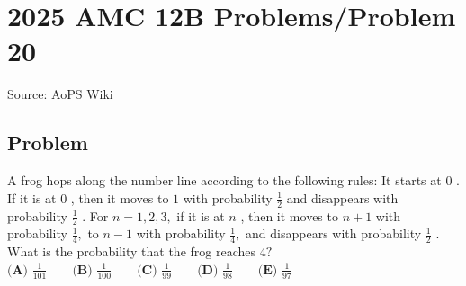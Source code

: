 \documentclass[12pt]{article}
\begin{document}
\section*{{2025 AMC 12B Problems/Problem 20}}
Source: AoPS Wiki

\subsection*{Problem}
A frog hops along the number line according to the following rules: It starts at $0$ . If it is at $0$ , then it moves to $1$ with probability $\frac 12$ and disappears with probability $\frac 12$ . For $n=1,2,3,$ if it is at $n$ , then it moves to $n+1$ with probability $\frac 14,$ to $n-1$ with probability $\frac 14,$ and disappears with probability $\frac 12$ . What is the probability that the frog reaches $4?$ $\textbf{(A) } \frac1{101} \qquad \textbf{(B) } \frac 1{100} \qquad \textbf{(C) } \frac1{99} \qquad \textbf{(D) } \frac1{98} \qquad \textbf{(E) } \frac1{97}$
\end{document}
